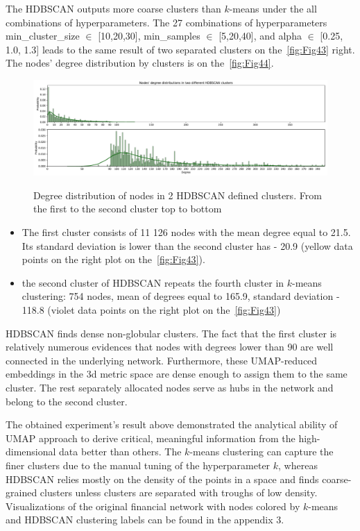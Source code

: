 The HDBSCAN outputs more coarse clusters than $k$-means under the all combinations of hyperparameters. The 27 combinations of hyperparameters min\_cluster\_size $\in$ [10,20,30], min\_samples $\in$ [5,20,40], and alpha $\in$ [0.25, 1.0, 1.3] leads to the same result of two separated clusters on the~\autoref{fig:Fig43} right. The nodes' degree distribution by clusters is on the~\autoref{fig:Fig44}. 
\begin{figure}[H]
	\centering
	\includegraphics[width=1.0\textwidth]{images/evaluations/Fig45.pdf}\\
	\caption{Degree distribution of nodes in 2 HDBSCAN defined clusters. From the first to the second cluster top to bottom}
	\label{fig:Fig45}
\end{figure}

    \begin{itemize}
        \item The first cluster consists of 11 126 nodes with the mean degree equal to 21.5. Its standard deviation is lower than the second cluster has - 20.9 (yellow data points on the right plot on the~\autoref{fig:Fig43}).
        \item the second cluster of HDBSCAN repeats the fourth cluster in $k$-means clustering: 754 nodes, mean of degrees equal to 165.9, standard deviation - 118.8 (violet data points on the right plot on the~\autoref{fig:Fig43})
    \end{itemize}
HDBSCAN finds dense non-globular clusters. The fact that the first cluster is relatively numerous evidences that nodes with degrees lower than 90 are well connected in the underlying network. Furthermore, these UMAP-reduced embeddings in the 3d metric space are dense enough to assign them to the same cluster. The rest separately allocated nodes serve as hubs in the network and belong to the second cluster.

The obtained experiment's result above demonstrated the analytical ability of UMAP approach to derive critical, meaningful information from the high-dimensional data better than others. The $k$-means clustering can capture the finer clusters due to the manual tuning of the hyperparameter $k$, whereas HDBSCAN relies mostly on the density of the points in a space and finds coarse-grained clusters unless clusters are separated with troughs of low density. Visualizations of the original financial network with nodes colored by $k$-means and HDBSCAN clustering labels can be found in the appendix 3.

